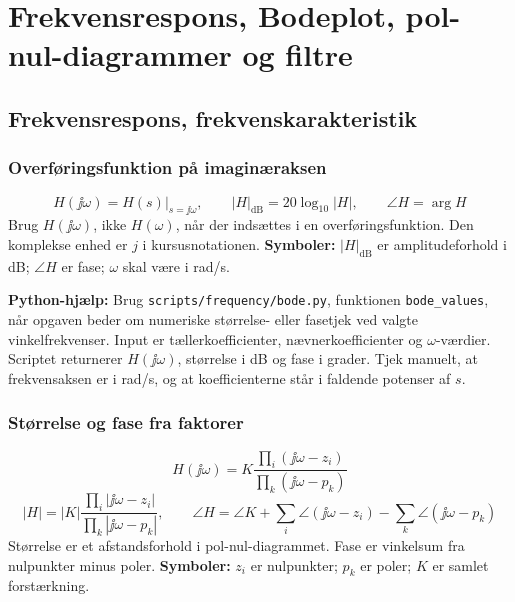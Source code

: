 \section{Frekvensrespons, Bodeplot, pol-nul-diagrammer og filtre}

\subsection{Frekvensrespons, frekvenskarakteristik}

\subsubsection{Overføringsfunktion på imaginæraksen}
\[
H(\jj\omega)=H(s)\big|_{s=\jj\omega},\qquad
|H|_{\mathrm{dB}}=20\log_{10}|H|,\qquad
\angle H=\arg H
\]
Brug \(H(\jj\omega)\), ikke \(H(\omega)\), når der indsættes i en overføringsfunktion. Den komplekse enhed er \(j\) i kursusnotationen.
\textbf{Symboler:} \(|H|_{\mathrm{dB}}\) er amplitudeforhold i dB; \(\angle H\) er fase; \(\omega\) skal være i rad/s.

\textbf{Python-hjælp:} Brug \texttt{scripts/frequency/bode.py}, funktionen \texttt{bode\_values}, når opgaven beder om numeriske størrelse- eller fasetjek ved valgte vinkelfrekvenser. Input er tællerkoefficienter, nævnerkoefficienter og \(\omega\)-værdier. Scriptet returnerer \(H(\jj\omega)\), størrelse i dB og fase i grader. Tjek manuelt, at frekvensaksen er i rad/s, og at koefficienterne står i faldende potenser af \(s\).

\subsubsection{Størrelse og fase fra faktorer}
\[
H(\jj\omega)=K\frac{\prod_i(\jj\omega-z_i)}{\prod_k(\jj\omega-p_k)}
\]
\[
|H|=|K|\frac{\prod_i|\jj\omega-z_i|}{\prod_k|\jj\omega-p_k|},\qquad
\angle H=\angle K+\sum_i\angle(\jj\omega-z_i)-\sum_k\angle(\jj\omega-p_k)
\]
Størrelse er et afstandsforhold i pol-nul-diagrammet. Fase er vinkelsum fra nulpunkter minus poler.
\textbf{Symboler:} \(z_i\) er nulpunkter; \(p_k\) er poler; \(K\) er samlet forstærkning.

